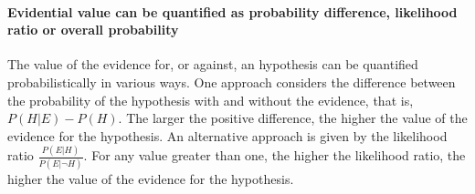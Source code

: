 \documentclass[10pt]{article}
\begin{document}
\paragraph{Evidential value can be quantified as probability difference, likelihood ratio or overall probability}
The value of the evidence for, or against, an hypothesis 
can be quantified probabilistically in various ways. 
One approach considers the difference between the probability of 
the hypothesis with and without the evidence, that is, $P(H | E) - P(H)$.
The larger the positive difference, the higher the value of the evidence 
for the hypothesis. 
An alternative approach is given by the likelihood ratio $\frac{P(E|H)}{P(E| \neg H)}$. 
For any value greater than one, the higher the likelihood ratio, 
the higher the value of the evidence for the hypothesis. %
%
%
\end{document}
